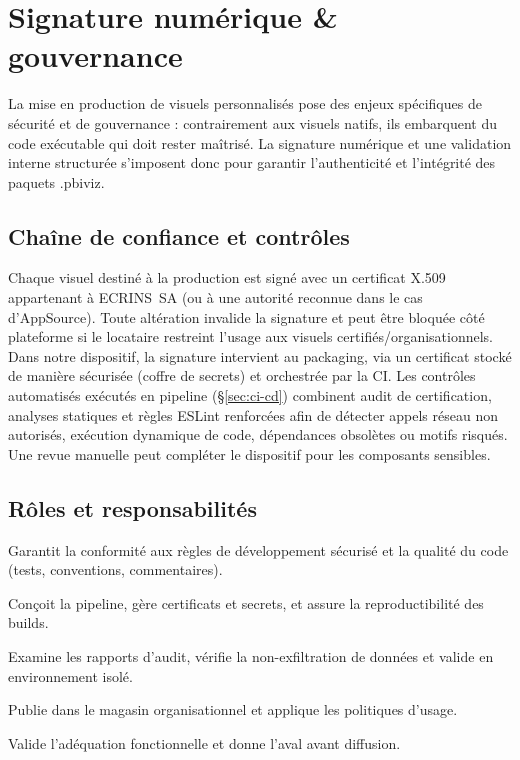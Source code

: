 
\section{Signature numérique \& gouvernance}
\label{sec:signature}

La mise en production de visuels personnalisés pose des enjeux spécifiques de sécurité et de gouvernance : contrairement aux visuels natifs, ils embarquent du code exécutable qui doit rester maîtrisé. La signature numérique et une validation interne structurée s’imposent donc pour garantir l’authenticité et l’intégrité des paquets .pbiviz.

\subsection{Chaîne de confiance et contrôles}
Chaque visuel destiné à la production est signé avec un certificat X.509 appartenant à ECRINS~SA (ou à une autorité reconnue dans le cas d’AppSource). Toute altération invalide la signature et peut être bloquée côté plateforme si le locataire restreint l’usage aux visuels certifiés/organisationnels. Dans notre dispositif, la signature intervient au packaging, via un certificat stocké de manière sécurisée (coffre de secrets) et orchestrée par la CI. Les contrôles automatisés exécutés en pipeline (\S\ref{sec:ci-cd}) combinent audit de certification, analyses statiques et règles ESLint renforcées afin de détecter appels réseau non autorisés, exécution dynamique de code, dépendances obsolètes ou motifs risqués. Une revue manuelle peut compléter le dispositif pour les composants sensibles.

\subsection{Rôles et responsabilités}

\begin{description}[leftmargin=0pt, labelsep=0.5em, itemsep=.25\baselineskip]
  \item[Développeur du visuel] Garantit la conformité aux règles de développement sécurisé et la qualité du code (tests, conventions, commentaires).
  \item[Responsable CI/CD] Conçoit la pipeline, gère certificats et secrets, et assure la reproductibilité des builds.
  \item[Sécurité / Administrateur Power BI] Examine les rapports d’audit, vérifie la non-exfiltration de données et valide en environnement isolé.
  \item[Administrateur du tenant Power BI] Publie dans le magasin organisationnel et applique les politiques d’usage.
  \item[Responsable produit / métier] Valide l’adéquation fonctionnelle et donne l’aval avant diffusion.
\end{description}

